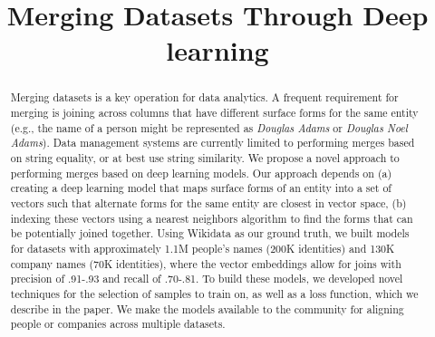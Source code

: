 \documentclass[letterpaper]{article} %
\begin{document}
%
\title{Merging Datasets Through Deep learning}




\maketitle
\begin{abstract}
Merging datasets is a key operation for data analytics.  A frequent requirement for merging is joining across columns that have different surface forms for the same entity (e.g., the name of a person might be represented as \textit{Douglas Adams} or \textit{Douglas Noel Adams}).  Data management systems are currently limited to performing merges based on string equality, or at best use string similarity.  We propose a novel approach to performing merges based on deep learning models.  Our approach depends on (a) creating a deep learning model that maps surface forms of an entity into a set of vectors such that alternate forms for the same entity are closest in vector space, (b) indexing these vectors using a nearest neighbors algorithm to find the forms that can be potentially joined together.  Using Wikidata as our ground truth, we built models for datasets with approximately 1.1M people's names (200K identities) and 130K company names (70K identities), where the vector embeddings allow for joins with precision of .91-.93 and recall of .70-.81. To build these models, we developed novel techniques for the selection of samples to train on, as well as a loss function, which we describe in the paper.  We make the models available to the community for aligning people or companies across multiple datasets.
  
\end{abstract}








  
  
  
\end{document}
